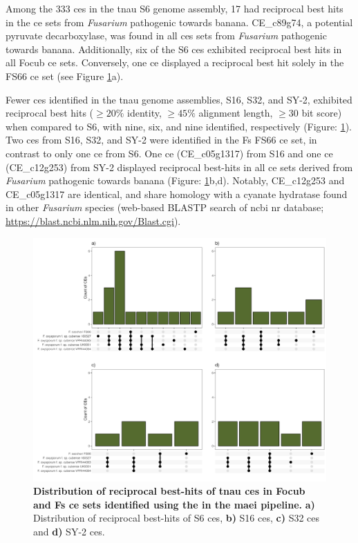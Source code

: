 Among the 333 \acp{ce} in the \ac{tnau} S6 genome assembly, 17 had reciprocal best hits in the \ac{ce} sets from \textit{Fusarium} pathogenic towards banana. CE\_c89g74, a potential pyruvate decarboxylase, was found in all \acp{ce} sets from \textit{Fusarium}  pathogenic towards banana. Additionally, six of the S6 \acp{ce} exhibited reciprocal best hits in all \ac{Focub} \ac{ce} sets. Conversely, one \ac{ce} displayed a reciprocal best hit solely in the FS66 \ac{ce} set (see Figure \ref{fig:RBHupsets}a). 

Fewer \acp{ce} identified in the \ac{tnau} genome assemblies, S16, S32, and SY-2, exhibited reciprocal best hits ($\geq20\%$ identity, $\geq45\%$ alignment length, $\geq30$ bit score) when compared to S6, with nine, six, and nine identified, respectively (Figure: \ref{fig:RBHupsets}). Two \acp{ce} from S16, S32, and SY-2 were identified in the \ac{Fs} FS66 \ac{ce} set, in contrast to only one \ac{ce} from S6. One \ac{ce} (CE\_c05g1317) from S16 and one \ac{ce} (CE\_c12g253) from SY-2 displayed reciprocal best-hits in all \ac{ce} sets derived from \textit{Fusarium} pathogenic towards banana (Figure: \ref{fig:RBHupsets}b,d). Notably, CE\_c12g253 and CE\_c05g1317 are identical, and share homology with a cyanate hydratase found in other \textit{Fusarium} species (web-based BLASTP search of \ac{ncbi} nr database; \href{https://blast.ncbi.nlm.nih.gov/Blast.cgi}{https://blast.ncbi.nlm.nih.gov/Bla\-st.cgi}).
 
\begin{figure}[hp!]
    \centering
    \includegraphics[width=\textwidth]{Figures/UpSetPlots.png}
    \caption[Distribution of reciprocal best-hits of \ac{tnau} \acp{ce}  in \ac{Focub} and \ac{Fs} \ac{ce} sets identified using the in the \ac{maei} pipeline.]{\textbf{Distribution of reciprocal best-hits of \ac{tnau} \acp{ce} in \ac{Focub} and \ac{Fs} \ac{ce} sets identified using the in the \ac{maei} pipeline.} \textbf{a)} Distribution of reciprocal best-hits of S6 \acp{ce}, \textbf{b)} S16 \acp{ce}, \textbf{c)} S32 \acp{ce} and \textbf{d)} SY-2 \acp{ce}.}
    \label{fig:RBHupsets}
\end{figure}

